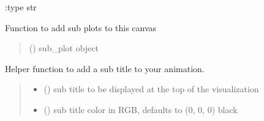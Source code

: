 \documentclass[letterpaper,10pt,english]{sphinxmanual}
\begin{document}
\begin{fulllineitems}
\begin{fulllineitems}
\begin{quote}
\begin{description}
\end{description}\end{quote}

\sphinxAtStartPar
:type str

\end{fulllineitems}


\begin{fulllineitems}
\label{\detokenize{index:sjvisualizer.Canvas.canvas.add_sub_plot}}
\pysigstartsignatures
{}
\pysigstopsignatures
\sphinxAtStartPar
Function to add sub plots to this canvas
\begin{quote}\begin{description}
\sphinxAtStartPar
{} () \textendash{} sub\_plot object

\end{description}\end{quote}

\end{fulllineitems}


\begin{fulllineitems}
\label{\detokenize{index:sjvisualizer.Canvas.canvas.add_sub_title}}
\pysigstartsignatures
{}
\pysigstopsignatures
\sphinxAtStartPar
Helper function to add a sub title to your animation.
\begin{quote}\begin{description}
\begin{itemize}
\item {} 
\sphinxAtStartPar
{} () \textendash{} sub title to be displayed at the top of the visualization

\item {} 
\sphinxAtStartPar
{} () \textendash{} sub title color in RGB, defaults to (0, 0, 0) black


\end{itemize}
\end{description}
\end{quote}
\end{fulllineitems}
\end{fulllineitems}
\end{document}

